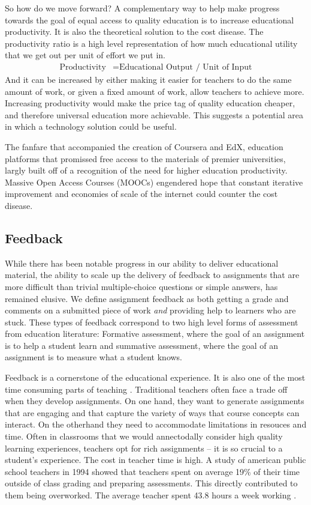 So how do we move forward? A complementary way to help make progress towards the goal of equal access to quality education is to increase educational productivity. It is also the theoretical solution to the cost disease. The productivity ratio is a high level representation of how much educational utility that we get out per unit of effort we put in. 
\begin{align*}
\text{Productivity} &= \text{Educational Output / Unit of Input} 
\end{align*}
And it can be increased by either making it easier for teachers to do the same amount of work, or given a fixed amount of work, allow teachers to achieve more. Increasing productivity would make the price tag of  quality education cheaper, and therefore universal education more achievable. This suggests a potential area in which a technology solution could be useful. 

The fanfare that accompanied the creation of Coursera and EdX, education platforms that promissed free access to the materials of premier universities, largly built off of a recognition of the need for higher education productivity. Massive Open Access Courses (MOOCs) engendered hope that constant iterative
improvement and economies of scale of the internet could counter the cost disease.

\subsection{Feedback}

While there has been notable progress in our ability to deliver educational material, the ability to scale up the delivery of feedback to assignments that are more difficult than trivial multiple-choice questions or simple answers, has remained elusive. We define assignment feedback as both getting a grade and comments on a submitted piece of work \emph{and} providing help to learners who are stuck. These types of feedback correspond to two high level forms of assessment from education literature: Formative assessment, where the goal of an assignment is to help a student learn and summative assessment, where the goal of an assignment is to measure what a student knows.

Feedback is a cornerstone of the educational experience. It is also one of the most time consuming parts of teaching \cite{sadler2006impact}. Traditional teachers often face a trade off when they develop assignments. On one hand, they want to generate assignments that are engaging and that capture the variety of ways that course concepts can interact. On the otherhand they need to accommodate limitations in resouces and time. Often in classrooms that we would annectodally consider high quality learning experiences, teachers opt for rich assignments -- it is so crucial to a student's experience. The cost in teacher time is high. A study of american public school teachers in 1994 showed that teachers spent on average 19\% of their time outside of class grading and preparing assessments. This directly contributed to them being overworked. The average teacher spent 43.8 hours a week working \cite{henke1996schools}.

